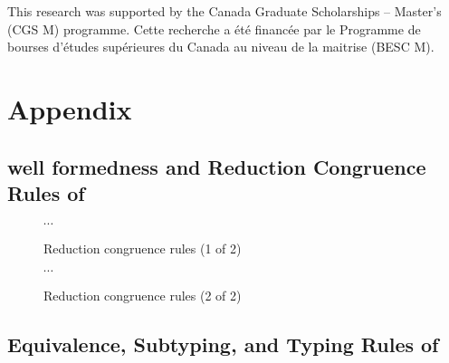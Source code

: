 \documentclass[acmsmall,review,anonymous]{acmart}\settopmatter{printfolios=true,printccs=false,printacmref=false}
\begin{document}
\begin{acks}
This research was supported by the Canada Graduate Scholarships -- Master’s (CGS M) programme.
Cette recherche a \'et\'e financ\'ee par le Programme de bourses d'\'etudes sup\'erieures
du Canada au niveau de la maitrise (BESC M).
\end{acks}



\clearpage
\appendix
\section{Appendix}




\allowdisplaybreaks

\subsection{well formedness and Reduction Congruence Rules of \lang} \label{app:cong:red}

\begin{figure}[h]
\centering
\fbox{$\red{\Phi; \Gamma}{\tau}{\tau}$} \qquad $\cdots$ \hfill
{}
\caption{Reduction congruence rules (1 of 2)}
\label{fig:cong:red*}
\end{figure}

\begin{figure}[h]
\centering
\fbox{$\red{\Phi; \Gamma}{\tau}{\tau}$} \qquad $\cdots$ \hfill
{}
\caption{Reduction congruence rules (2 of 2)}
\label{fig:cong:red*}
\end{figure}

\clearpage
\subsection{Equivalence, Subtyping, and Typing Rules of \CICE} \label{app:equiv}
\end{document}
